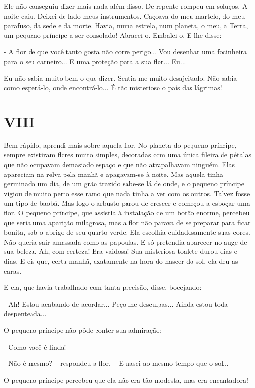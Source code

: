 Ele não conseguiu dizer mais nada além disso. De repente rompeu em
soluços. A noite caiu. Deixei de lado meus instrumentos. Caçoava do meu
martelo, do meu parafuso, da sede e da morte. Havia, numa estrela, num
planeta, o meu, a Terra, um pequeno príncipe a ser consolado! Abracei-o.
Embalei-o. E lhe disse:

- A flor de que você tanto gosta não corre perigo... Vou desenhar uma
focinheira para o seu carneiro... E uma proteção para a sua flor...
Eu...

Eu não sabia muito bem o que dizer. Sentia-me muito desajeitado. Não
sabia como esperá-lo, onde encontrá-lo... É tão misterioso o país das
lágrimas!

\chapter{VIII}

Bem rápido, aprendi mais sobre aquela flor. No planeta do pequeno
príncipe, sempre existiram flores muito simples, decoradas com uma única
fileira de pétalas que não ocupavam demasiado espaço e que não
atrapalhavam ninguém. Elas apareciam na relva pela manhã e apagavam-se à
noite. Mas aquela tinha germinado um dia, de um grão trazido sabe-se lá
de onde, e o pequeno príncipe vigiou de muito perto esse ramo que nada
tinha a ver com os outros. Talvez fosse um tipo de baobá. Mas logo o
arbusto parou de crescer e começou a esboçar uma flor. O pequeno
príncipe, que assistia à instalação de um botão enorme, percebeu que
seria uma aparição milagrosa, mas a flor não parava de se preparar para
ficar bonita, sob o abrigo de seu quarto verde. Ela escolhia
cuidadosamente suas cores. Não queria sair amassada como as papoulas. E
só pretendia aparecer no auge de sua beleza. Ah, com certeza! Era
vaidosa! Sua misteriosa toalete durou dias e dias. E eis que, certa
manhã, exatamente na hora do nascer do sol, ela deu as caras.

E ela, que havia trabalhado com tanta precisão, disse, bocejando:

- Ah! Estou acabando de acordar... Peço-lhe desculpas... Ainda estou
toda despenteada...

O pequeno príncipe não pôde conter sua admiração:

- Como você é linda!

- Não é mesmo? -- respondeu a flor. -- E nasci ao mesmo tempo que o
sol...

O pequeno príncipe percebeu que ela não era tão modesta, mas era
encantadora!

